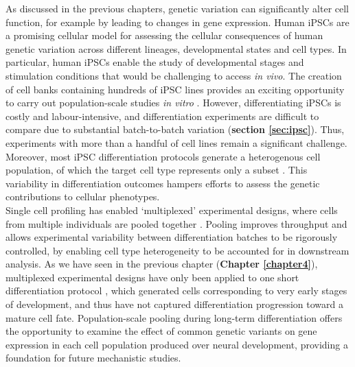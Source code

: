 As discussed in the previous chapters, genetic variation can significantly alter cell function, for example by leading to changes in gene expression. 
Human iPSCs are a promising cellular model for assessing the cellular consequences of human genetic variation across different lineages, developmental states and cell types. 
In particular, human iPSCs enable the study of developmental stages and stimulation conditions that would be challenging to access \textit{in vivo}. 
The creation of cell banks containing hundreds of iPSC lines \cite{kilpinen2017common} provides an exciting opportunity to carry out population-scale studies \textit{in vitro} \cite{cuomo2020single, strober2019dynamic, schwartzentruber2018molecular, alasoo2018shared}.
However, differentiating iPSCs is costly and labour-intensive, and differentiation experiments are difficult to compare due to substantial batch-to-batch variation (\textbf{section 
\ref{sec:ipsc}}).
Thus, experiments with more than a handful of cell lines remain a significant challenge.
Moreover, most iPSC differentiation protocols generate a heterogenous cell population, of which the target cell type represents only a subset \cite{d2019vitro, banovich2018impact, volpato2018reproducibility, nguyen2018single}. 
This variability in differentiation outcomes hampers efforts to assess the genetic contributions to cellular phenotypes.\\

Single cell profiling has enabled `multiplexed' experimental designs, where cells from multiple individuals are pooled together \cite{cuomo2020single, nguyen2018single}. 
Pooling improves throughput and allows experimental variability between differentiation batches to be rigorously controlled, by enabling cell type heterogeneity to be accounted for in downstream analysis. 
As we have seen in the previous chapter (\textbf{Chapter 
\ref{chapter4}}),
multiplexed experimental designs have only been applied to one short differentiation protocol \cite{cuomo2020single}, which generated cells corresponding to very early stages of development, and thus have not captured differentiation progression toward a mature cell fate. 
Population-scale pooling during long-term differentiation offers the opportunity to examine the effect of common genetic variants on gene expression in each cell population produced over neural development, providing a foundation for future mechanistic studies.\\

